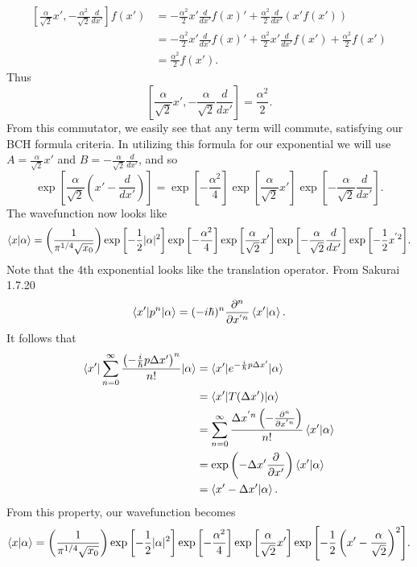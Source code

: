 \documentclass[11pt,letterpaper]{article}
\begin{document}
\begin{enumerate}
\begin{enumerate}
  \begin{align*}\left[\frac{\alpha}{\sqrt 2}x',-\frac{\alpha^2}{\sqrt 2}\frac{d}{dx'}\right]f(x') &= -\frac{\alpha^2}{2}x'\frac{d}{dx'}f(x)'+\frac{\alpha^2}{2}\frac{d}{dx'}(x'f(x'))\\
  &=-\frac{\alpha^2}{2}x'\frac{d}{dx'}f(x)'+\frac{\alpha^2}{2}x'\frac{d}{dx'}f(x')+\frac{\alpha^2}{2}f(x')\\
  &=\frac{\alpha^2}{2}f(x').
  \end{align*}
  Thus
  $$\left[\frac{\alpha}{\sqrt 2}x',-\frac{\alpha}{\sqrt 2}\frac{d}{dx'}\right] = \frac{\alpha^2}{2}.$$
  From this commutator, we easily see that any term will commute, satisfying our BCH formula criteria. In utilizing this formula for our exponential we will use $A = \frac{\alpha}{\sqrt 2}x'$ and $B = -\frac{\alpha}{\sqrt 2}\frac{d}{dx'}$, and so
    $$\exp{\left[\frac{\alpha}{\sqrt 2}\left(x'-\frac{d}{dx'}\right)\right]} = \exp{\left[-\frac{\alpha^2}{4}\right]}\exp{\left[\frac{\alpha}{\sqrt2}x'\right]}\exp{\left[-\frac{\alpha}{\sqrt2}\frac{d}{dx'}\right]}.$$
    The wavefunction now looks like 
    $$\braket{x|\alpha} = \left(\frac{1}{\pi^{1/4}\sqrt{x_0}}\right)\exp{\left[-\frac{1}{2}|\alpha|^2\right]}\exp{\left[-\frac{\alpha^2}{4}\right]}\exp{\left[\frac{\alpha}{\sqrt2}x'\right]}\exp{\left[-\frac{\alpha}{\sqrt2}\frac{d}{dx'}\right]}\exp{\left[-\frac{1}{2}x^{'2}\right]}.$$
    Note that the 4th exponential looks like the translation operator. From Sakurai 1.7.20
    $$\braket{x'|p^n|\alpha} = (-i\hbar)^n\frac{\partial^n}{\partial x^{'n}}\braket{x'|\alpha}.$$
    It follows that
    \begin{align*}\braket{x'|\sum_{n=0}^\infty{\frac{\left(-\frac{i}{\hbar}p\Delta x'\right)^n}{n!}}|\alpha} &= \braket{x'|e^{-\frac{i}{\hbar}p\Delta x'}|\alpha} \\&= \braket{x'|T(\Delta x')|\alpha}\\
    &=\sum_{n=0}^\infty{\frac{\Delta x^{'n}\left(-\frac{\partial^n}{\partial x^{'n}}\right)}{n!}}\braket{x'|\alpha}\\
    &= \exp{\left(-\Delta x'\frac{\partial}{\partial x'}\right)}\braket{x'|\alpha}\\
    &=\braket{x'-\Delta x'|\alpha}.
    \end{align*}
    From this property, our wavefunction becomes
        $$\braket{x|\alpha} = \left(\frac{1}{\pi^{1/4}\sqrt{x_0}}\right)\exp{\left[-\frac{1}{2}|\alpha|^2\right]}\exp{\left[-\frac{\alpha^2}{4}\right]}\exp{\left[\frac{\alpha}{\sqrt2}x'\right]}\exp{\left[-\frac{1}{2}\left(x'-\frac{\alpha}{\sqrt 2}\right)^2\right]}.$$

\end{enumerate}
\end{enumerate}
\end{document}
